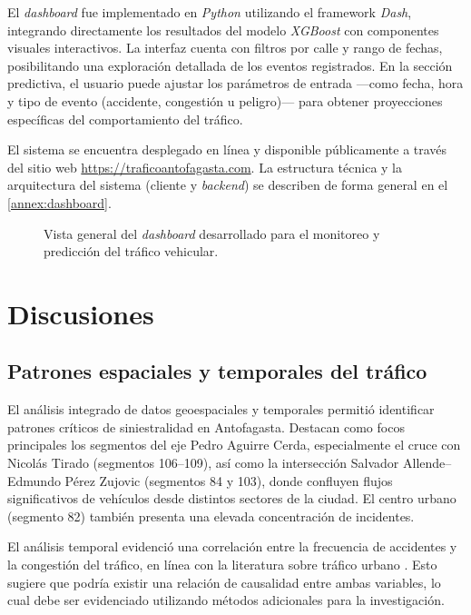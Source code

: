 \documentclass[12pt]{article}
\begin{document}
El \textit{dashboard} fue implementado en \textit{Python} utilizando el framework \textit{Dash}, integrando directamente los resultados del modelo \textit{XGBoost} con componentes visuales interactivos. La interfaz cuenta con filtros por calle y rango de fechas, posibilitando una exploración detallada de los eventos registrados. En la sección predictiva, el usuario puede ajustar los parámetros de entrada —como fecha, hora y tipo de evento (accidente, congestión u peligro)— para obtener proyecciones específicas del comportamiento del tráfico.

El sistema se encuentra desplegado en línea y disponible públicamente a través del sitio web \url{https://traficoantofagasta.com}. La estructura técnica y la arquitectura del sistema (cliente y \textit{backend}) se describen de forma general en el \autoref{annex:dashboard}.

\begin{figure}[H]
    \centering
    \hfill
    \caption{Vista general del \textit{dashboard} desarrollado para el monitoreo y predicción del tráfico vehicular.}
    \label{fig:dashboard_general}
\end{figure}

\section{Discusiones}

\subsection{Patrones espaciales y temporales del tráfico}

El análisis integrado de datos geoespaciales y temporales permitió identificar patrones críticos de siniestralidad en Antofagasta. Destacan como focos principales los segmentos del eje Pedro Aguirre Cerda, especialmente el cruce con Nicolás Tirado (segmentos 106–109), así como la intersección Salvador Allende–Edmundo Pérez Zujovic (segmentos 84 y 103), donde confluyen flujos significativos de vehículos desde distintos sectores de la ciudad. El centro urbano (segmento 82) también presenta una elevada concentración de incidentes.

El análisis temporal evidenció una correlación entre la frecuencia de accidentes y la congestión del tráfico, en línea con la literatura sobre tráfico urbano \parencite{berhanu2024}. Esto sugiere que podría existir una relación de causalidad entre ambas variables, lo cual debe ser evidenciado utilizando métodos adicionales para la investigación.
\end{document}
